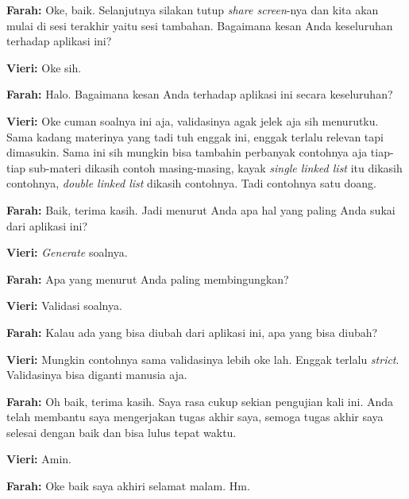 \textbf{Farah:} Oke, baik. Selanjutnya silakan tutup \textit{share screen}-nya dan kita akan mulai di sesi terakhir yaitu sesi tambahan. Bagaimana kesan Anda keseluruhan terhadap aplikasi ini?

\textbf{Vieri:} Oke sih.

\textbf{Farah:} Halo. Bagaimana kesan Anda terhadap aplikasi ini secara keseluruhan?

\textbf{Vieri:} Oke cuman soalnya ini aja, validasinya agak jelek aja sih menurutku. Sama kadang materinya yang tadi tuh enggak ini, enggak terlalu relevan tapi dimasukin. Sama ini sih mungkin bisa tambahin perbanyak contohnya aja tiap-tiap sub-materi dikasih contoh masing-masing, kayak \textit{single linked list} itu dikasih contohnya, \textit{double linked list} dikasih contohnya. Tadi contohnya satu doang.

\textbf{Farah:} Baik, terima kasih. Jadi menurut Anda apa hal yang paling Anda sukai dari aplikasi ini?

\textbf{Vieri:} \textit{Generate} soalnya.

\textbf{Farah:} Apa yang menurut Anda paling membingungkan?

\textbf{Vieri:} Validasi soalnya.

\textbf{Farah:} Kalau ada yang bisa diubah dari aplikasi ini, apa yang bisa diubah?

\textbf{Vieri:} Mungkin contohnya sama validasinya lebih oke lah. Enggak terlalu \textit{strict}. Validasinya bisa diganti manusia aja.

\textbf{Farah:} Oh baik, terima kasih. Saya rasa cukup sekian pengujian kali ini. Anda telah membantu saya mengerjakan tugas akhir saya, semoga tugas akhir saya selesai dengan baik dan bisa lulus tepat waktu.

\textbf{Vieri:} Amin.

\textbf{Farah:} Oke baik saya akhiri selamat malam. Hm.
